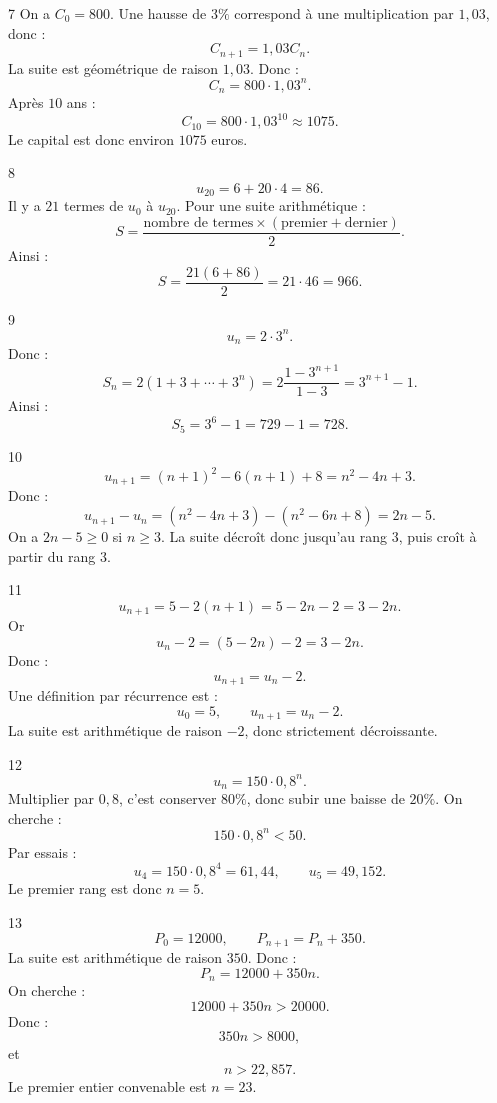 \documentclass[11pt,a4paper]{article}
\begin{document}
\begin{solbox}{7}
On a \(C_0=800\). Une hausse de \(3\%\) correspond à une multiplication par \(1{,}03\), donc :
\[
C_{n+1}=1{,}03C_n.
\]
La suite est géométrique de raison \(1{,}03\). Donc :
\[
C_n=800\cdot1{,}03^n.
\]
Après \(10\) ans :
\[
C_{10}=800\cdot1{,}03^{10}\approx1075.
\]
Le capital est donc environ \(1075\) euros.
\end{solbox}

\begin{solbox}{8}
\[
u_{20}=6+20\cdot4=86.
\]
Il y a \(21\) termes de \(u_0\) à \(u_{20}\). Pour une suite arithmétique :
\[
S=\frac{\text{nombre de termes}\times(\text{premier}+\text{dernier})}{2}.
\]
Ainsi :
\[
S=\frac{21(6+86)}2=21\cdot46=966.
\]
\end{solbox}

\begin{solbox}{9}
\[
u_n=2\cdot3^n.
\]
Donc :
\[
S_n=2(1+3+\cdots+3^n)=2\frac{1-3^{n+1}}{1-3}=3^{n+1}-1.
\]
Ainsi :
\[
S_5=3^6-1=729-1=728.
\]
\end{solbox}

\begin{solbox}{10}
\[
u_{n+1}=(n+1)^2-6(n+1)+8=n^2-4n+3.
\]
Donc :
\[
u_{n+1}-u_n=(n^2-4n+3)-(n^2-6n+8)=2n-5.
\]
On a \(2n-5\geq0\) si \(n\geq3\). La suite décroît donc jusqu'au rang \(3\), puis croît à partir du rang \(3\).
\end{solbox}

\begin{solbox}{11}
\[
u_{n+1}=5-2(n+1)=5-2n-2=3-2n.
\]
Or
\[
u_n-2=(5-2n)-2=3-2n.
\]
Donc :
\[
u_{n+1}=u_n-2.
\]
Une définition par récurrence est :
\[
u_0=5,\qquad u_{n+1}=u_n-2.
\]
La suite est arithmétique de raison \(-2\), donc strictement décroissante.
\end{solbox}

\begin{solbox}{12}
\[
u_n=150\cdot0{,}8^n.
\]
Multiplier par \(0{,}8\), c'est conserver \(80\%\), donc subir une baisse de \(20\%\).  
On cherche :
\[
150\cdot0{,}8^n<50.
\]
Par essais :
\[
u_4=150\cdot0{,}8^4=61{,}44,\qquad u_5=49{,}152.
\]
Le premier rang est donc \(n=5\).
\end{solbox}

\begin{solbox}{13}
\[
P_0=12000,\qquad P_{n+1}=P_n+350.
\]
La suite est arithmétique de raison \(350\). Donc :
\[
P_n=12000+350n.
\]
On cherche :
\[
12000+350n>20000.
\]
Donc :
\[
350n>8000,
\]
et
\[
n>22{,}857.
\]
Le premier entier convenable est \(n=23\).
\end{solbox}
\end{document}

